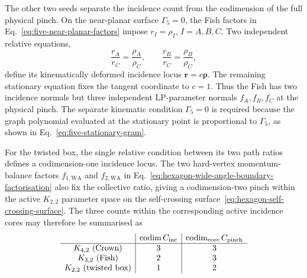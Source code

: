 \documentclass[a4paper,11pt]{article}
\begin{document}
The other two seeds separate the incidence count from the codimension of the
full physical pinch.  On the near-planar surface \(\Gamma_5=0\), the Fish
factors in Eq.~\eqref{eq:five-near-planar-factors} impose
\(r_I=\rho_I\), \(I=A,B,C\).  Two independent relative equations,
\begin{equation}
 \frac{r_A}{r_C}=\frac{\rho_A}{\rho_C},
 \qquad
 \frac{r_B}{r_C}=\frac{\rho_B}{\rho_C},
 \label{eq:fish-deformed-incidence-ratios}
\end{equation}
define its kinematically deformed incidence locus
\(\boldsymbol r=c\boldsymbol\rho\).  The remaining stationary equation fixes
the tangent coordinate to \(c=1\).  Thus the Fish has two incidence normals
but three independent LP-parameter normals \(f_A,f_B,f_C\) at the physical
pinch.  The separate kinematic condition \(\Gamma_5=0\) is required because
the graph polynomial evaluated at the stationary point is proportional to
\(\Gamma_5\), as shown in Eq.~\eqref{eq:five-stationary-gram}.

For the twisted box, the single relative condition between its two path
ratios defines a codimension-one incidence locus.  The two hard-vertex
momentum-balance factors \(f_{1,\mathrm{WA}}\) and \(f_{2,\mathrm{WA}}\) in
Eq.~\eqref{eq:hexagon-wide-angle-boundary-factorisation} also fix the
collective ratio, giving a codimension-two pinch within the active
\(K_{2,2}\) parameter space on the self-crossing
surface~\eqref{eq:hexagon-self-crossing-surface}.  The three counts within
the corresponding active incidence cores may therefore be summarised as
\begin{equation}
 \begin{array}{c|c|c}
  & \operatorname{codim} C_{\rm inc}
  & \operatorname{codim}_{\rm core} C_{\rm pinch}\\ \hline
  K_{4,2}\ \text{(Crown)} &3&3\\
  K_{3,2}\ \text{(Fish)} &2&3\\
  K_{2,2}\ \text{(twisted box)} &1&2
 \end{array}
 \label{eq:seed-cycle-normal-counts}
\end{equation}
\end{document}
